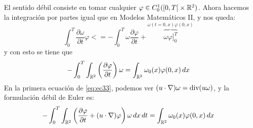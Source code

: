 El sentido débil consiste en tomar cualquier $\varphi \in C^1_0(\left[0, T\right[ \times \mathbb{R}^2)$. Ahora hacemos la integración por partes 
igual que en Modelos Matemáticos II, y nos queda:
$$\int_{0}^{T} \dfrac{\partial \omega}{\partial t} \varphi <= - \int_{0}^{T} \omega \dfrac{\partial \varphi}{\partial t} + 
\overbrace{\omega \varphi]_{0}^{T}}^{\omega(t=0,x) \varphi(0,x)}$$
y con esto se tiene que 
$$- \int_{0}^{T} \int_{\mathbb{R}^2} \left( \dfrac{\partial \varphi}{\partial t} \right) \omega = \int_{\mathbb{R}^2} \omega_0(x) \varphi(0,x)\,dx$$
En la primera ecuación de \eqref{eq:ec33}, podemos ver $(u \cdot \nabla)\omega = \text{div}(u \omega)$, y la formulación débil de Euler es:
$$- \int_{0}^{T} \int_{\mathbb{R}^2} \left( \dfrac{\partial \varphi}{\partial t} + (u \cdot \nabla) \varphi \right) \omega\,dx\,dt = \int_{\mathbb{R}^2} \omega_0(x) \varphi(0,x)\,dx$$

